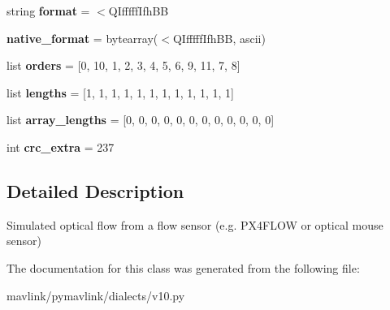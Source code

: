 \begin{DoxyCompactItemize}
\item 
\mbox{\label{classpymavlink_1_1dialects_1_1v10_1_1MAVLink__hil__optical__flow__message_a97110afdfc3ccbe8d8c022be67ceb0fd}} 
string {\bfseries format} = \textquotesingle{}$<$Q\+Ifffff\+Ifh\+BB\textquotesingle{}
\item 
\mbox{\label{classpymavlink_1_1dialects_1_1v10_1_1MAVLink__hil__optical__flow__message_aea4c483bc1f72d61aee9e8d7fbd7d99b}} 
{\bfseries native\+\_\+format} = bytearray(\textquotesingle{}$<$Q\+Ifffff\+Ifh\+BB\textquotesingle{}, \textquotesingle{}ascii\textquotesingle{})
\item 
\mbox{\label{classpymavlink_1_1dialects_1_1v10_1_1MAVLink__hil__optical__flow__message_ad94af419b3532ddd0efbbc91343fd50d}} 
list {\bfseries orders} = \mbox{[}0, 10, 1, 2, 3, 4, 5, 6, 9, 11, 7, 8\mbox{]}
\item 
\mbox{\label{classpymavlink_1_1dialects_1_1v10_1_1MAVLink__hil__optical__flow__message_a8d0769c4fb781ae30de9287753c3598b}} 
list {\bfseries lengths} = \mbox{[}1, 1, 1, 1, 1, 1, 1, 1, 1, 1, 1, 1\mbox{]}
\item 
\mbox{\label{classpymavlink_1_1dialects_1_1v10_1_1MAVLink__hil__optical__flow__message_aee27befc8c5375f21ca0bcc351479a18}} 
list {\bfseries array\+\_\+lengths} = \mbox{[}0, 0, 0, 0, 0, 0, 0, 0, 0, 0, 0, 0\mbox{]}
\item 
\mbox{\label{classpymavlink_1_1dialects_1_1v10_1_1MAVLink__hil__optical__flow__message_ae2e45dd208081d8a044369e484d179fe}} 
int {\bfseries crc\+\_\+extra} = 237
\end{DoxyCompactItemize}


\subsection{Detailed Description}
\begin{DoxyVerb}Simulated optical flow from a flow sensor (e.g. PX4FLOW or
optical mouse sensor)
\end{DoxyVerb}
 

The documentation for this class was generated from the following file\+:\begin{DoxyCompactItemize}
\item 
mavlink/pymavlink/dialects/v10.\+py\end{DoxyCompactItemize}
